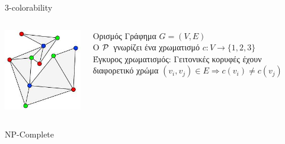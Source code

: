 \documentclass[10pt,handout]{beamer}
\begin{document}
\begin{frame}{3-colorability}
\begin{columns}
\begin{center}
\includegraphics[scale=0.5]{3cp.jpg}
\end{center}

\begin{block}{Ορισμός}
Γράφημα $G=(V,E)$ \\ \pause
O $\mathcal{P}\,$  γνωρίζει ένα χρωματισμό  $c:V \rightarrow \{ 1,2,3 \}$  \\ \pause
Έγκυρος χρωματισμός: Γειτονικές κορυφές έχουν διαφορετικό χρώμα
$(v_i, v_j) \in E \Rightarrow   c(v_i) \neq c(v_j)$\\
\end{block}
\end{columns}
NP-Complete
\end{frame}
 
\end{document}

